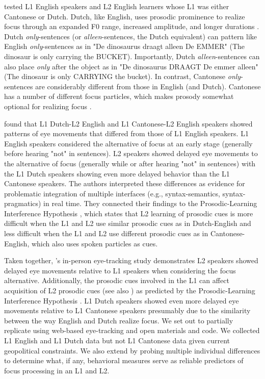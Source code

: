 \cite{Ge2021} tested L1 English speakers and L2 English learners whose L1 was either Cantonese or Dutch. Dutch, like English, uses prosodic prominence to realize focus through an expanded F0 range, increased amplitude, and longer durations \citep{dimitrova2010focus}. Dutch \textit{only}-sentences (or \textit{alleen}-sentences, the Dutch equivalent) can pattern like English \textit{only}-sentences as in "De dinosaurus draagt alleen De EMMER" (The dinosaur is only carrying the BUCKET). Importantly, Dutch \textit{alleen}-sentences can also place \textit{only} after the object as in "De dinosaurus DRAAGT De emmer alleen" (The dinosaur is only CARRYING the bucket). In contrast, Cantonese \textit{only}-sentences are considerably different from those in English (and Dutch). Cantonese has a number of different focus particles, which makes prosody somewhat optional for realizing focus \citep{lee2019focus, wu2010prosodic, ge2024bilingual, fung2000final}. 

\cite{Ge2021} found that L1 Dutch-L2 English and L1 Cantonese-L2 English speakers showed patterns of eye movements that differed from those of L1 English speakers. L1 English speakers considered the alternative of focus at an early stage (generally before hearing "not" in sentences). L2 speakers showed delayed eye movements to the alternative of focus (generally while or after hearing "not" in sentences) with the L1 Dutch speakers showing even more delayed behavior than the L1 Cantonese speakers. The authors interpreted these differences as evidence for problematic integration of multiple interfaces (e.g., syntax-semantics, syntax-pragmatics) in real time. They connected their findings to the Prosodic-Learning Interference Hypothesis \citep{tremblay2016effects, tremblay2021re}, which states that L2 learning of prosodic cues is more difficult when the L1 and L2 use similar prosodic cues as in Dutch-English and less difficult when the L1 and L2 use different prosodic cues as in Cantonese-English, which also uses spoken particles as cues. 

Taken together, \cite{Ge2021}'s in-person eye-tracking study demonstrates L2 speakers showed delayed eye movements relative to L1 speakers when considering the focus alternative. Additionally, the prosodic cues involved in the L1 can affect acquisition of L2 prosodic cues (see also \cite{ge2021comprehension}) as predicted by the Prosodic-Learning Interference Hypothesis \citep{tremblay2016effects}. L1 Dutch speakers showed even more delayed eye movements relative to L1 Cantonese speakers presumably due to the similarity between the way English and Dutch realize focus. We set out to partially replicate \cite{Ge2021} using web-based eye-tracking and open materials and code. We collected L1 English and L1 Dutch data but not L1 Cantonese data given current geopolitical constraints. We also extend \cite{Ge2021} by probing multiple individual differences to determine what, if any, behavioral measures serve as reliable predictors of focus processing in an L1 and L2. 

